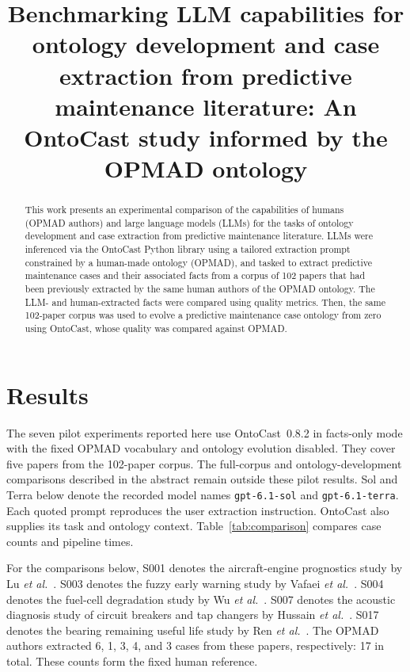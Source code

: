 \documentclass[journal]{IEEEtran}
\title{Benchmarking LLM capabilities for ontology development and case extraction from predictive maintenance literature: An OntoCast study informed by the OPMAD ontology}
\author{}
\begin{document}
\maketitle

\begin{abstract}
This work presents an experimental comparison of the capabilities of humans (OPMAD authors) and large language models (LLMs) for the tasks of ontology development and case extraction from predictive maintenance literature.
LLMs were inferenced via the OntoCast Python library using a tailored extraction prompt constrained by a human-made ontology (OPMAD), and tasked to extract predictive maintenance cases and their associated facts from a corpus of 102 papers that had been previously extracted by the same human authors of the OPMAD ontology.
The LLM- and human-extracted facts were compared using quality metrics.
Then, the same 102-paper corpus was used to evolve a predictive maintenance case ontology from zero using OntoCast, whose quality was compared against OPMAD.
\end{abstract}

\section{Results}
\label{sec:results}

The seven pilot experiments reported here use OntoCast~0.8.2 in facts-only mode with the fixed OPMAD vocabulary and ontology evolution disabled. They cover five papers from the 102-paper corpus. The full-corpus and ontology-development comparisons described in the abstract remain outside these pilot results. Sol and Terra below denote the recorded model names \texttt{gpt-6.1-sol} and \texttt{gpt-6.1-terra}. Each quoted prompt reproduces the user extraction instruction. OntoCast also supplies its task and ontology context. Table~\ref{tab:comparison} compares case counts and pipeline times.

For the comparisons below, S001 denotes the aircraft-engine prognostics study by Lu \emph{et al.}~\cite{lu2019}. S003 denotes the fuzzy early warning study by Vafaei \emph{et al.}~\cite{vafaei2019}. S004 denotes the fuel-cell degradation study by Wu \emph{et al.}~\cite{wu2016}. S007 denotes the acoustic diagnosis study of circuit breakers and tap changers by Hussain \emph{et al.}~\cite{hussain2015}. S017 denotes the bearing remaining useful life study by Ren \emph{et al.}~\cite{ren2018}. The OPMAD authors extracted 6, 1, 3, 4, and 3 cases from these papers, respectively: 17 in total. These counts form the fixed human reference.
\end{document}
